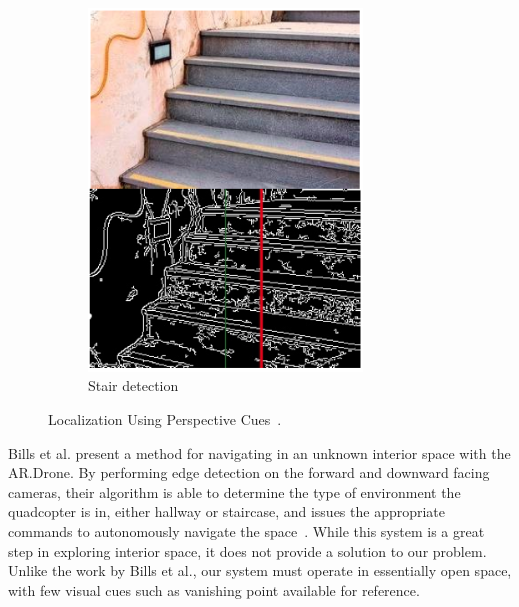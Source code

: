 \begin{figure}[ht]
\begin{subfigure}[b]{0.5\textwidth}
                    \includegraphics[width=0.8\textwidth]{../images/Bills2.png}
                    \caption{Stair detection}
            \end{subfigure}
            \caption{Localization Using Perspective Cues~\cite{Bills}.}
    \end{figure}

	Bills et al. present a method for navigating in an unknown interior space with the AR.Drone. By performing edge detection on the forward and downward facing cameras, their algorithm is able to determine the type of environment the quadcopter is in, either hallway or staircase, and issues the appropriate commands to autonomously navigate the space~\cite{Bills}. While this system is a great step in exploring interior space, it does not provide a solution to our problem. Unlike the work by Bills et al., our system must operate in essentially open space, with few visual cues such as vanishing point available for reference.

